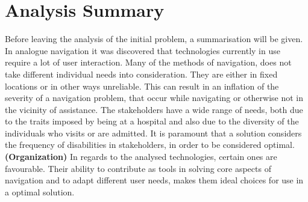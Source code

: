 \section{Analysis Summary} \label{analsum}
Before leaving the analysis of the initial problem, a summarisation will be given. In analogue navigation it was discovered that technologies currently in use require a lot of user interaction. Many of the methods of navigation, does not take different individual needs into consideration. They are either in fixed locations or in other ways unreliable. This can result in an inflation of the severity of a navigation problem, that occur while navigating or otherwise not in the vicinity of assistance. 
The stakeholders have a wide range of needs, both due to the traits imposed by being at a hospital and also due to the diversity of the individuals who visits or are admitted. It is paramount that a solution considers the frequency of disabilities in stakeholders, in order to be considered optimal.
\textbf{(Organization)}
In regards to the analysed technologies, certain ones are favourable. Their ability to contribute as tools in solving core aspects of navigation and to adapt different user needs, makes them ideal choices for use in a optimal solution.